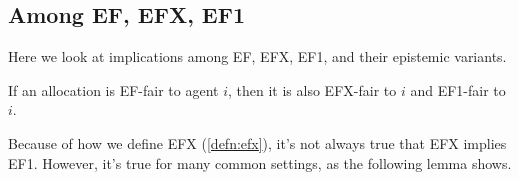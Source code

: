 \subsection{Among EF, EFX, EF1}
\label{sec:impls-extra:among-ef-efx-ef1}

Here we look at implications among EF, EFX, EF1, and their epistemic variants.

\begin{remark}
\label{thm:impl:ef-to-efx+ef1}
If an allocation is EF-fair to agent $i$, then it is also EFX-fair to $i$ and EF1-fair to $i$.
\end{remark}

Because of how we define EFX (\cref{defn:efx}),
it's not always true that EFX implies EF1.
However, it's true for many common settings, as the following lemma shows.


